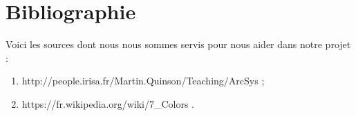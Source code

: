\documentclass[a4paper,11pt]{article}
\begin{document}
\section{Bibliographie}
Voici les sources dont nous nous sommes servis pour nous aider dans notre projet :
\begin{enumerate}
\item http://people.irisa.fr/Martin.Quinson/Teaching/ArcSys ;
\item https://fr.wikipedia.org/wiki/7\_Colors .
\end{enumerate}
\end{document}
